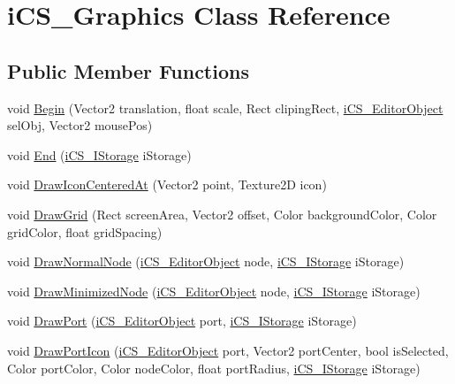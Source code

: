 \hypertarget{classi_c_s___graphics}{\section{i\+C\+S\+\_\+\+Graphics Class Reference}
\label{classi_c_s___graphics}
}
\subsection*{Public Member Functions}
\begin{DoxyCompactItemize}
\item 
void \hyperlink{classi_c_s___graphics_a4714337c01dd51ab927a48a8ebd60e0a}{Begin} (Vector2 translation, float scale, Rect cliping\+Rect, \hyperlink{classi_c_s___editor_object}{i\+C\+S\+\_\+\+Editor\+Object} sel\+Obj, Vector2 mouse\+Pos)
\item 
void \hyperlink{classi_c_s___graphics_aea6b34f4254f03b5ee5cf67e46055780}{End} (\hyperlink{classi_c_s___i_storage}{i\+C\+S\+\_\+\+I\+Storage} i\+Storage)
\item 
void \hyperlink{classi_c_s___graphics_a921ddf4b45d4b90b18947c7c9f5daf60}{Draw\+Icon\+Centered\+At} (Vector2 point, Texture2\+D icon)
\item 
void \hyperlink{classi_c_s___graphics_ae110bdfc08f461db862e0730f92b5654}{Draw\+Grid} (Rect screen\+Area, Vector2 offset, Color background\+Color, Color grid\+Color, float grid\+Spacing)
\item 
void \hyperlink{classi_c_s___graphics_ae5604a083331f156dddfb3730e31118e}{Draw\+Normal\+Node} (\hyperlink{classi_c_s___editor_object}{i\+C\+S\+\_\+\+Editor\+Object} node, \hyperlink{classi_c_s___i_storage}{i\+C\+S\+\_\+\+I\+Storage} i\+Storage)
\item 
void \hyperlink{classi_c_s___graphics_a7b6d3cfbad105fcc962d1dca7f488dc4}{Draw\+Minimized\+Node} (\hyperlink{classi_c_s___editor_object}{i\+C\+S\+\_\+\+Editor\+Object} node, \hyperlink{classi_c_s___i_storage}{i\+C\+S\+\_\+\+I\+Storage} i\+Storage)
\item 
void \hyperlink{classi_c_s___graphics_a4e7b938500862c47238ceca5fc9e25ac}{Draw\+Port} (\hyperlink{classi_c_s___editor_object}{i\+C\+S\+\_\+\+Editor\+Object} port, \hyperlink{classi_c_s___i_storage}{i\+C\+S\+\_\+\+I\+Storage} i\+Storage)
\item 
void \hyperlink{classi_c_s___graphics_ac1ede2ae67812e2b6e3e916c143ce0a7}{Draw\+Port\+Icon} (\hyperlink{classi_c_s___editor_object}{i\+C\+S\+\_\+\+Editor\+Object} port, Vector2 port\+Center, bool is\+Selected, Color port\+Color, Color node\+Color, float port\+Radius, \hyperlink{classi_c_s___i_storage}{i\+C\+S\+\_\+\+I\+Storage} i\+Storage)

\end{DoxyCompactItemize}
